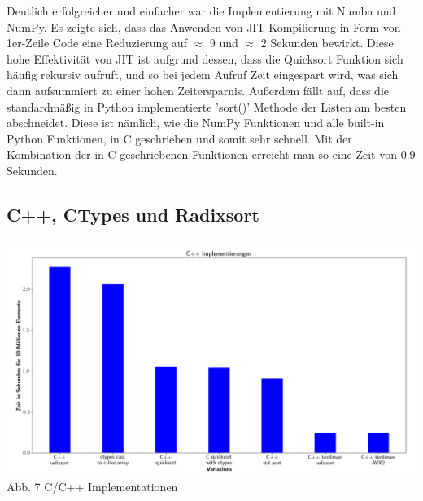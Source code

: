 \documentclass[11pt,a4paper]{article}
\begin{document}
Deutlich erfolgreicher und einfacher war die Implementierung mit Numba und NumPy.
Es zeigte sich, dass das Anwenden von JIT-Kompilierung in Form von 1er-Zeile Code
eine Reduzierung auf $\approx$ 9 und $\approx$ 2 Sekunden bewirkt. Diese hohe Effektivität von JIT
ist aufgrund dessen, dass die Quicksort Funktion sich häufig rekursiv aufruft, und so bei jedem Aufruf
Zeit eingespart wird, was sich dann aufsummiert zu einer hohen Zeitersparnis.
Außerdem fällt auf, dass die standardmäßig in Python implementierte 'sort()' Methode der Listen
am besten abschneidet. Diese ist nämlich, wie die NumPy Funktionen und alle built-in Python Funktionen, in C geschrieben und
somit sehr schnell. Mit der Kombination der in C geschriebenen Funktionen erreicht man so eine Zeit von 0.9 Sekunden.

\subsection{C++, CTypes und Radixsort}

\begin{center}
    \hspace*{-1.5cm}\includegraphics[width=1.2\textwidth]{./diagramme/matplotlib/cpp.png}
    Abb. 7 C/C++ Implementationen
\end{center}
\end{document}

